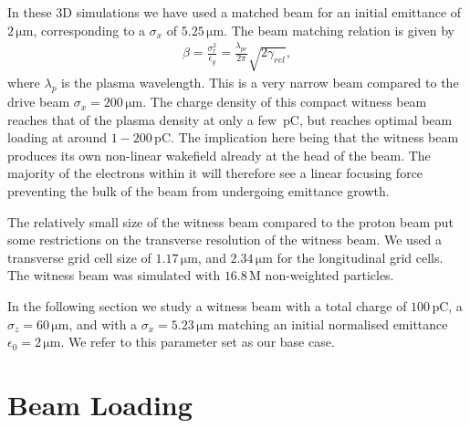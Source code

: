 \documentclass[aps,prstab,reprint,amsmath,amssymb,groupedaddress]{revtex4-1}
\newcommand{\unit}[1]{\,\mathrm{#1}}
\begin{document}
In these 3D simulations we have used a matched beam for an initial emittance of $2\unit{\mu m}$, corresponding to a
$\sigma_{x}$ of $5.25\unit{\mu m}$. The beam matching relation is given by
\begin{align}
    \beta = \frac{\sigma_r^2}{\epsilon_g} = \frac{\lambda_{pe}}{2\pi}\sqrt{2\gamma_{rel}}, \label{EQ:Matched}
\end{align}
where $\lambda_{p}$ is the plasma wavelength. This is a very narrow beam compared to the drive beam
$\sigma_{x} = 200\unit{\mu m}$. The charge density of this compact witness beam reaches that of the plasma density at
only a few $\unit{pC}$, but reaches optimal beam loading at around $1-200\unit{pC}$. The implication here being that the
witness beam produces its own non-linear wakefield already at the head of the beam. The majority of the electrons
within it will therefore see a linear focusing force preventing the bulk of the beam from undergoing emittance growth.

The relatively small size of the witness beam compared to the proton beam put some restrictions on the transverse
resolution of the witness beam. We used a transverse grid cell size of $1.17\unit{\mu m}$, and $2.34\unit{\mu m}$ for
the longitudinal grid cells. The witness beam was simulated with $16.8\unit{M}$ non-weighted particles.

In the following section we study a witness beam with a total charge of $100\unit{pC}$, a $\sigma_{z}=60\unit{\mu m}$,
and with a $\sigma_{x}=5.23\unit{\mu m}$ matching an initial normalised emittance $\epsilon_{0} = 2\unit{\mu m}$. We
refer to this parameter set as our base case.

\section[\label{S:BL}]{Beam Loading}
\end{document}
